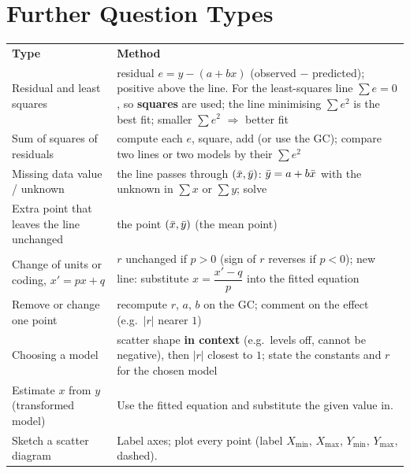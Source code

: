 \section{Further Question Types}
\begin{center}\renewcommand{\arraystretch}{1.12}\footnotesize
\begin{tabular}{|L{4.6cm}|L{10.6cm}|}\hline
\textbf{Type} & \textbf{Method}\\\Xhline{2pt}
Residual and least squares & residual $e=y-(a+bx)$ (observed $-$ predicted); positive above the line. For the least-squares line $\sum e=0$, so \textbf{squares} are used; the line minimising $\sum e^{2}$ is the best fit; smaller $\sum e^{2}$ $\Rightarrow$ better fit\\\hline
Sum of squares of residuals & compute each $e$, square, add (or use the GC); compare two lines or two models by their $\sum e^{2}$\\\hline
Missing data value / unknown & the line passes through $(\bar{x},\bar{y})$: $\bar{y}=a+b\bar{x}$ with the unknown in $\sum x$ or $\sum y$; solve\\\hline
Extra point that leaves the line unchanged & the point $(\bar{x},\bar{y})$ (the mean point)\\\hline
Change of units or coding, $x'=px+q$ & $r$ unchanged if $p>0$ (sign of $r$ reverses if $p<0$); new line: substitute $x=\dfrac{x'-q}{p}$ into the fitted equation\\\hline
Remove or change one point & recompute $r$, $a$, $b$ on the GC; comment on the effect (e.g.\ $|r|$ nearer $1$)\\\hline
Choosing a model & scatter shape \textbf{in context} (e.g.\ levels off, cannot be negative), then $|r|$ closest to $1$; state the constants and $r$ for the chosen model\\\hline
Estimate $x$ from $y$ (transformed model) & Use the fitted equation and substitute the given value in.\\\hline
Sketch a scatter diagram & Label axes; plot every point (label $X_{\min}$, $X_{\max}$, $Y_{\min}$, $Y_{\max}$, dashed).\\\hline
\end{tabular}\end{center}
